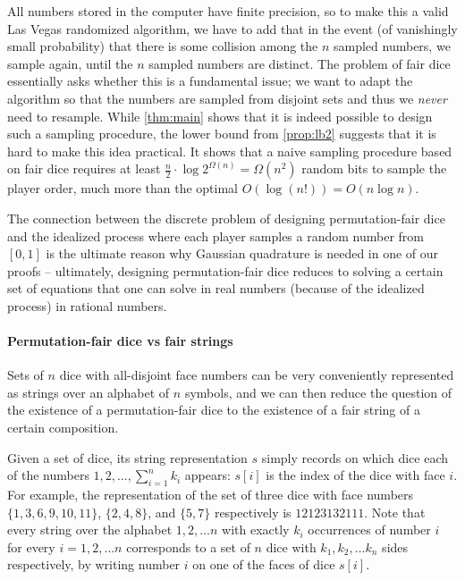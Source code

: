 \documentclass{article}
\begin{document}
All numbers stored in the computer have finite precision, so to make this a valid Las Vegas randomized algorithm, we have to add that in the event (of vanishingly small probability) that there is some collision among the $n$ sampled numbers, we sample again, until the $n$ sampled numbers are distinct. The problem of fair dice essentially asks whether this is a fundamental issue; we want to adapt the algorithm so that the numbers are sampled from disjoint sets and thus we \emph{never} need to resample. While \cref{thm:main} shows that it is indeed possible to design such a sampling procedure, the lower bound from \cref{prop:lb2} suggests that it is hard to make this idea practical. It shows that a naive sampling procedure based on fair dice requires at least $\frac{n}{2} \cdot \log 2^{\Omega(n)} = \Omega(n^2)$ random bits to sample the player order, much more than the optimal $O(\log (n!)) = O(n \log n)$. 

The connection between the discrete problem of designing permutation-fair dice and the idealized process where each player samples a random number from $[0,1]$ is the ultimate reason why Gaussian quadrature is needed in one of our proofs -- ultimately, designing permutation-fair dice reduces to solving a certain set of equations that one can solve in real numbers (because of the idealized process) in rational numbers. 

\paragraph{Permutation-fair dice vs fair strings}
Sets of $n$ dice with all-disjoint face numbers can be very conveniently represented as strings over an alphabet of $n$ symbols, and we can then reduce the question of the existence of a permutation-fair dice to the existence of a fair string of a certain composition. 

Given a set of dice, its string representation $s$ simply records on which dice each of the numbers $1, 2, \dots, \sum_{i = 1}^n k_i$ appears: $s[i]$ is the index of the dice with face $i$. For example, the representation of the set of three dice with face numbers $\{1,3,6,9,10,11\}$, $\{2,4,8\}$, and $\{5,7\}$ respectively is $12123132111$. Note that every string over the alphabet $1,2,\dots n$ with exactly $k_i$ occurrences of number $i$ for every $i=1, 2, \dots n$ corresponds to a set of $n$ dice with $k_1, k_2, \dots k_n$ sides respectively, by writing number $i$ on one of the faces of dice $s[i]$. 
\end{document}
